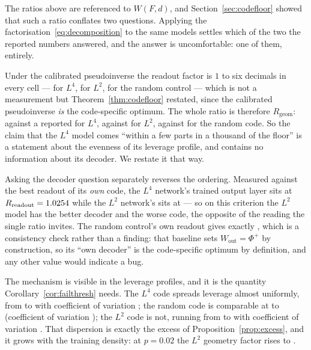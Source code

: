 The ratios above are referenced to $W(F,d)$, and Section~\ref{sec:codefloor} showed that such a
ratio conflates two questions. Applying the factorisation~\eqref{eq:decomposition} to the same
models settles which of the two the reported numbers answered, and the answer is uncomfortable:
one of them, entirely.

Under the calibrated pseudoinverse the readout factor is $1$ to six decimals in every cell ---
\GoneLfourRreadoutPinv{} for $L^4$, \GoneLtwoRreadoutPinv{} for $L^2$,
\GoneRandRreadoutPinv{} for the random control --- which is not a measurement but
Theorem~\ref{thm:codefloor} restated, since the calibrated pseudoinverse \emph{is} the
code-specific optimum. The whole ratio is therefore $R_{\mathrm{geom}}$:
\GoneLfourRgeom{} against a reported \GoneLfourRatio{} for $L^4$, \GoneLtwoRgeom{} against
\GoneLtwoRatio{} for $L^2$, \GoneRandRgeom{} against \GoneRandRatio{} for the random code. So
the claim that the $L^4$ model comes ``within a few parts in a thousand of the floor'' is a
statement about the evenness of its leverage profile, and contains no information about its
decoder. We restate it that way.

Asking the decoder question separately reverses the ordering. Measured against the best readout
of its \emph{own} code, the $L^4$ network's trained output layer sits at
$R_{\mathrm{readout}}=1.0254{}$ while the $L^2$ network's sits at
\GoneLtwoRreadoutWout{} --- so on this criterion the $L^2$ model has the better decoder and the
worse code, the opposite of the reading the single ratio invites. The random control's own
readout gives exactly \GoneRandRreadoutWout{}, which is a consistency check rather than a
finding: that baseline sets $W_{\mathrm{out}}=\Phi^{+}$ by construction, so its ``own decoder''
is the code-specific optimum by definition, and any other value would indicate a bug.

The mechanism is visible in the leverage profiles, and it is the quantity
Corollary~\ref{cor:failthresh} needs. The $L^4$ code spreads leverage almost uniformly, from
\GoneLfourLeverageMin{} to \GoneLfourLeverageMax{} with coefficient of variation
\GoneLfourLeverageCv{}; the random code is comparable at \GoneRandLeverageMin{} to
\GoneRandLeverageMax{} (coefficient of variation \GoneRandLeverageCv{}); the $L^2$ code is not,
running from \GoneLtwoLeverageMin{} to \GoneLtwoLeverageMax{} with coefficient of variation
\GoneLtwoLeverageCv{}. That dispersion is exactly the excess of Proposition~\ref{prop:excess},
and it grows with the training density: at $p=0.02$ the $L^2$ geometry factor rises to
\GoneLtwoRgeomDenseP{}.

